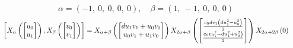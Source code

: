 \documentclass[11pt]{article}
\theoremstyle{definition}
\begin{document}
\[
\alpha = \left( -1, \  0, \  0, \  0, \  0\right), \quad \beta = \left( 1, \  -1, \  0, \  0, \  0\right)
\]
\[
\scaletoalign{\textwidth}{\left[ X_{\alpha}\left(\left[\begin{matrix}u_{0}\\u_{1}\end{matrix}\right]\right), X_{\beta}\left(\left[\begin{matrix}v_{0}\\v_{1}\end{matrix}\right]\right) \right] = X_{\alpha + \beta}\left(\left[\begin{matrix}d u_{1} v_{1} + u_{0} v_{0}\\u_{0} v_{1} + u_{1} v_{0}\end{matrix}\right]\right) X_{2\alpha + \beta}\left(\left[\begin{matrix}\frac{c_{0} d v_{1} \left(d u_{1}^{2} - u_{0}^{2}\right)}{2}\\\frac{c_{0} v_{0} \left(- d u_{1}^{2} + u_{0}^{2}\right)}{2}\end{matrix}\right]\right) X_{2\alpha + 2\beta}\left(0\right)}
\]
\end{document}
